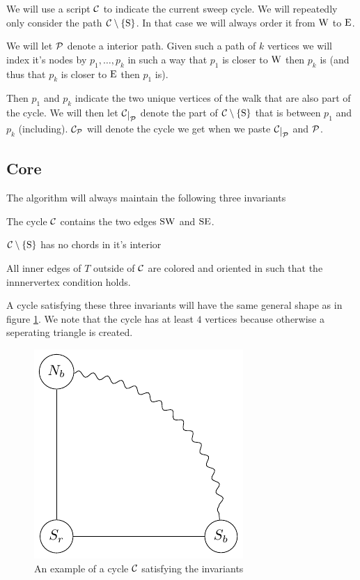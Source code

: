 We will use a script $\C$ to indicate the current sweep cycle. 
We will repeatedly only consider the path $\cpath$. In that case we will always order it from $\pW$ to $\pE$. 

We will let $\P$ denote a interior path. Given such a path of $k$ vertices we will index it's nodes by $p_1, \ldots, p_k$ in such a way that $p_1$ is closer to $\pW$ then $p_k$ is (and thus that $p_k$ is closer to $\pE$ then $p_1$ is). 

Then $p_1$ and $p_k$ indicate the two unique vertices of the walk that are also part of the cycle. We will then let $\restC{\P}$ denote the part of $\cpath$ that is between $p_1$ and $p_k$ (including). $\C_\P$ will denote the cycle we get when we paste $\restC{\P}$ and $\P$.



\subsection{Core}
\label{ss:core}

The algorithm will always maintain the following three invariants

\begin{invariants}
  \itemsep=-4pt

\item \label{i:1} The cycle $\C$ contains the two edges $\pS \pW$ and $\pS \pE$.
\item \label{i:2} $\cpath$ has no chords in it's interior 
\item \label{i:last} All inner edges of $T$ outside of $\C$ are colored and oriented in such that the innnervertex condition holds. %
\end{invariants}

A cycle satisfying these three invariants will have the same general shape as in figure \ref{fig:invCycle}. We note that the cycle has at least $4$ vertices because otherwise a seperating triangle is created. 

\begin{figure}[h!]
\centering
\includegraphics{img/invCycle}

\caption{An example of a cycle $\C$ satisfying the invariants 
    \label{fig:invCycle}}
\end{figure}

